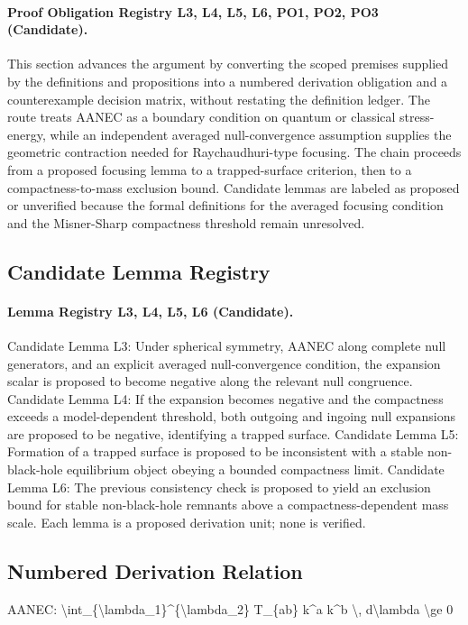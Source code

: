 \documentclass[conference]{IEEEtran}
\begin{document}
\paragraph{Proof Obligation Registry L3, L4, L5, L6, PO1, PO2, PO3 (Candidate).} This section advances the argument by converting the scoped premises supplied by the definitions and propositions into a numbered derivation obligation and a counterexample decision matrix, without restating the definition ledger. The route treats AANEC as a boundary condition on quantum or classical stress-energy, while an independent averaged null-convergence assumption supplies the geometric contraction needed for Raychaudhuri-type focusing. The chain proceeds from a proposed focusing lemma to a trapped-surface criterion, then to a compactness-to-mass exclusion bound. Candidate lemmas are labeled as proposed or unverified because the formal definitions for the averaged focusing condition and the Misner-Sharp compactness threshold remain unresolved.~\cite{cite_0ed84243cf171bc4}

\subsection{Candidate Lemma Registry}
\paragraph{Lemma Registry L3, L4, L5, L6 (Candidate).} Candidate Lemma L3: Under spherical symmetry, AANEC along complete null generators, and an explicit averaged null-convergence condition, the expansion scalar is proposed to become negative along the relevant null congruence. Candidate Lemma L4: If the expansion becomes negative and the compactness exceeds a model-dependent threshold, both outgoing and ingoing null expansions are proposed to be negative, identifying a trapped surface. Candidate Lemma L5: Formation of a trapped surface is proposed to be inconsistent with a stable non-black-hole equilibrium object obeying a bounded compactness limit. Candidate Lemma L6: The previous consistency check is proposed to yield an exclusion bound for stable non-black-hole remnants above a compactness-dependent mass scale. Each lemma is a proposed derivation unit; none is verified.

\subsection{Numbered Derivation Relation}
AANEC: \textbackslash{}int\_\{\textbackslash{}lambda\_1\}\textasciicircum{}\{\textbackslash{}lambda\_2\} T\_\{ab\} k\textasciicircum{}a k\textasciicircum{}b \textbackslash{}, d\textbackslash{}lambda \textbackslash{}ge 0
\end{document}
